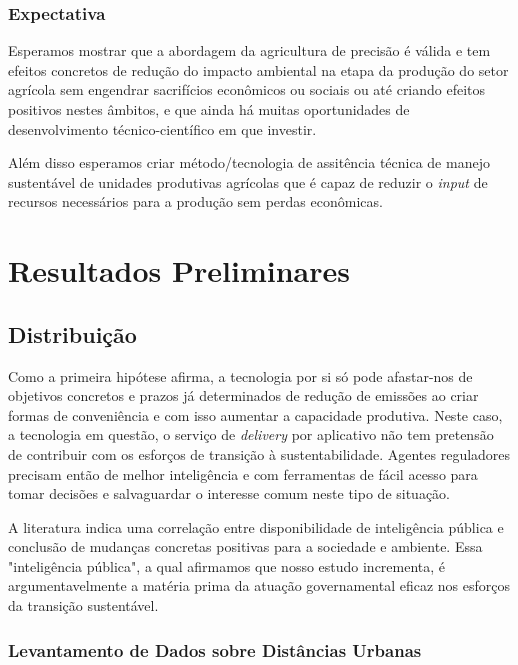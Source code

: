 \documentclass[14pt,a4paper]{article}
\begin{document}
	\subsubsection{Expectativa}
	
	Esperamos mostrar que a abordagem da agricultura de precisão é válida e tem efeitos concretos de redução do impacto ambiental na etapa da produção do setor agrícola sem engendrar sacrifícios econômicos ou sociais ou até criando efeitos positivos nestes âmbitos, e que ainda há muitas oportunidades de desenvolvimento técnico-científico em que investir. 
	
	Além disso esperamos criar método/tecnologia de assitência técnica de manejo sustentável de unidades produtivas agrícolas que é capaz de reduzir o \textit{input} de recursos necessários para a produção sem perdas econômicas. 
	
	\section{Resultados Preliminares}
	
	
	\subsection{Distribuição}
	
	Como a primeira hipótese afirma, a tecnologia por si só pode afastar-nos de objetivos concretos e prazos já determinados de redução de emissões ao criar formas de conveniência e com isso aumentar a capacidade produtiva. Neste caso, a tecnologia em questão, o serviço de \textit{delivery} por aplicativo não tem pretensão de contribuir com os esforços de transição à sustentabilidade. Agentes reguladores precisam então de melhor inteligência e com ferramentas de fácil acesso para tomar decisões e salvaguardar o interesse comum neste tipo de situação.
	
	A literatura indica uma correlação entre disponibilidade de inteligência pública e conclusão de mudanças concretas positivas para a sociedade e ambiente. Essa "inteligência pública", a qual afirmamos que nosso estudo incrementa, é argumentavelmente a matéria prima da atuação governamental eficaz nos esforços da transição sustentável. 
	
	\subsubsection{Levantamento de Dados sobre Distâncias Urbanas}
	
\end{document}
